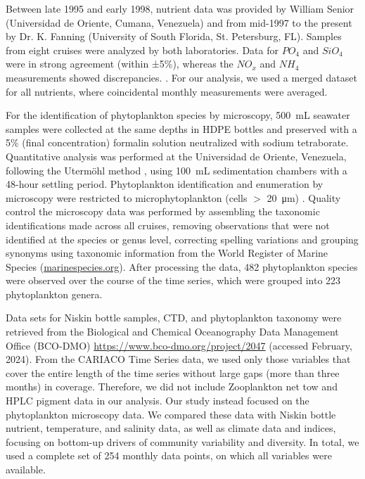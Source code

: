 \documentclass[draft]{agujournal2019}
\begin{document}
    
    Between late 1995 and early 1998, nutrient data was provided by William Senior (Universidad de Oriente, Cumana, Venezuela) and from mid-1997 to the present by Dr. K. Fanning (University of South Florida, St. Petersburg, FL). Samples from eight cruises were analyzed by both laboratories. Data for $PO_4$ and $SiO_4$ were in strong agreement (within ±5\%), whereas the $NO_x$ and $NH_4$ measurements showed discrepancies. \cite{taylor_ecosystem_2012}. For our analysis, we used a merged dataset for all nutrients, where coincidental monthly measurements were averaged.
       
    For the identification of phytoplankton species by microscopy, \qty{500}{\milli\liter} seawater samples were collected at the same depths in HDPE bottles and preserved with a 5\% (final concentration) formalin solution neutralized with sodium tetraborate. Quantitative analysis was performed at the Universidad de Oriente, Venezuela, following the Utermöhl method \cite{hasle1978inverted}, using \qty{100}{\milli\liter} sedimentation chambers with a 48-hour settling period. Phytoplankton identification and enumeration by microscopy were restricted to microphytoplankton (cells $>$ \qty{20}{\micro \meter}) \cite{mutshinda_environmental_2013}.
    Quality control the microscopy data was performed by assembling the taxonomic identifications made across all cruises, removing observations that were not identified at the species or genus level, correcting spelling variations and grouping synonyms using taxonomic information from the World Register of Marine Species (\url{marinespecies.org}). After processing the data, 482 phytoplankton species were observed over the course of the time series, which were grouped into 223 phytoplankton genera.

    
    Data sets for Niskin bottle samples, CTD, and phytoplankton taxonomy were retrieved from the Biological and Chemical Oceanography Data Management Office (BCO-DMO) \url{https://www.bco-dmo.org/project/2047} (accessed February, 2024). 
    From the CARIACO Time Series data, we used only those variables that cover the entire length of the time series without large gaps (more than three months) in coverage. Therefore, we did not include Zooplankton net tow and HPLC pigment data in our analysis. Our study instead focused on the phytoplankton microscopy data. We compared these data with Niskin bottle nutrient, temperature, and salinity data, as well as climate data and indices, focusing on bottom-up drivers of community variability and diversity. In total, we used a complete set of 254 monthly data points, on which all variables were available.
\end{document}
